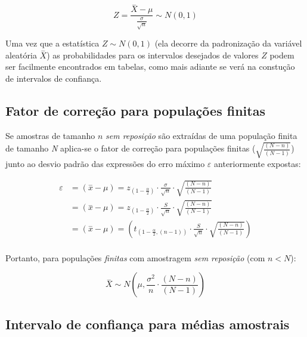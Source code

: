 \documentclass[
]{book}
\begin{document}
\hfill\break

\[
Z = \frac{\stackrel{-}{X} - \mu}{\frac{\sigma}{\sqrt{n}}}  \sim N(0 ,1)
\]

\hfill\break

Uma vez que a estatística \(Z \sim N(0 ,1)\) (ela decorre da padronização da variável aleatória \(\stackrel{-}{X}\)) as probabilidades para os intervalos desejados de valores \(Z\) podem ser facilmente encontrados em tabelas, como mais adiante se verá na constução de intervalos de confiança.

\hfill\break

\hypertarget{fator-de-correuxe7uxe3o-para-populauxe7uxf5es-finitas}{%
\subsection{Fator de correção para populações finitas}\label{fator-de-correuxe7uxe3o-para-populauxe7uxf5es-finitas}}

\hfill\break

Se amostras de tamanho \(n\) \emph{sem reposição} são extraídas de uma população finita de tamanho \emph{N} aplica-se o fator de correção para populações finitas (\(\sqrt{\frac{(N-n)}{(N-1)}}\)) junto ao desvio padrão das expressões do erro máximo \(\varepsilon\) anteriormente expostas:

\begin{align*}
\varepsilon & =(\stackrel{-}{x}-\mu)={z}_{(1-\frac{\alpha }{2})} \cdot \frac{\sigma}{\sqrt{n}} \cdot \sqrt{\frac{(N-n)}{(N-1)}} \\
& =(\stackrel{-}{x}-\mu)={z}_{(1-\frac{\alpha }{2})} \cdot \frac{S}{\sqrt{n}} \cdot \sqrt{\frac{(N-n)}{(N-1)}}\\
& =(\stackrel{-}{x}-\mu)= ({t}_{(1-\frac{\alpha }{2}, (n-1))} \cdot \frac{S}{\sqrt{n}} \cdot \sqrt{\frac{(N-n)}{(N-1)}})\\
\end{align*}

\hfill\break

Portanto, para populações \emph{finitas} com amostragem \emph{sem reposição} (com \(n<N\)):

\hfill\break

\[
\stackrel{-}{X} \sim N(\mu,  \frac{\sigma^{2}}{n} \cdot \frac{(N-n)}{(N-1)}    )
\]

\hfill\break

\hypertarget{intervalo-de-confianuxe7a-para-muxe9dias-amostrais}{%
\subsection{Intervalo de confiança para médias amostrais}\label{intervalo-de-confianuxe7a-para-muxe9dias-amostrais}}
\end{document}
